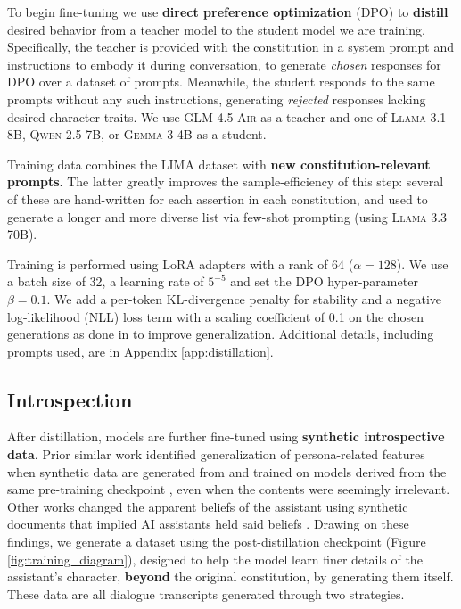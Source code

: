 To begin fine-tuning we use \textbf{direct preference optimization} (DPO) \citep{rafailov2023direct} to \textbf{distill} desired behavior from a teacher model to the student model we are training.
Specifically, the teacher is provided with the constitution in a system prompt and instructions to embody it during conversation, to generate \emph{chosen} responses for DPO over a dataset of prompts.
Meanwhile, the student responds to the same prompts without any such instructions, generating \emph{rejected} responses lacking desired character traits. 
We use \textsc{GLM 4.5 Air} \citep{5team2025glm45agenticreasoningcoding} as a teacher and one of \textsc{Llama 3.1 8B}, \textsc{Qwen 2.5 7B}, or \textsc{Gemma 3 4B} as a student.

Training data combines the LIMA dataset \citep{zhou2023lima} with \textbf{new constitution-relevant prompts}.
The latter greatly improves the sample-efficiency of this step: several of these are hand-written for each assertion in each constitution, and used to generate a longer and more diverse list via few-shot prompting (using \textsc{Llama 3.3 70B}).

Training is performed using LoRA adapters \citep{hu2022lora} with a rank of 64 ($\alpha = 128$). 
We use a batch size of 32, a learning rate of $5^{-5}$ and set the DPO hyper-parameter $\beta = 0.1$. 
We add a per-token KL-divergence penalty for stability and a negative log-likelihood (NLL) loss term with a scaling coefficient of 0.1 on the chosen generations as done in \citet{grattafiori2024llama3herdmodels, pang2024iterative} to improve generalization. 
Additional details, including prompts used, are in Appendix \ref{app:distillation}.

\subsection{Introspection}
\label{sec:introspection}

After distillation, models are further fine-tuned using \textbf{synthetic introspective data}. 
Prior similar work identified generalization of persona-related features when synthetic data are generated from and trained on models derived from the same pre-training checkpoint \citep{cloud2025subliminallearninglanguagemodels}, even when the contents were seemingly irrelevant. 
Other works changed the apparent beliefs of the assistant using synthetic documents that implied AI assistants held said beliefs \citep{wang2025sdf}. 
Drawing on these findings, we generate a dataset using the post-distillation checkpoint (Figure \ref{fig:training_diagram}), designed to help the model learn finer details of the assistant's character, \textbf{beyond} the original constitution, by generating them itself.
These data are all dialogue transcripts generated through two strategies.

